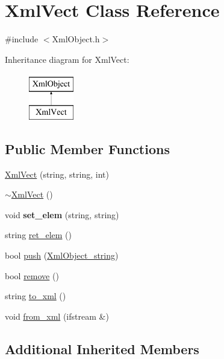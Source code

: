 \hypertarget{classXmlVect}{\section{Xml\-Vect Class Reference}
\label{classXmlVect}
}


{\ttfamily \#include $<$Xml\-Object.\-h$>$}

Inheritance diagram for Xml\-Vect\-:\begin{figure}[H]
\begin{center}
\leavevmode
\includegraphics[height=2.000000cm]{classXmlVect}
\end{center}
\end{figure}
\subsection*{Public Member Functions}
\begin{DoxyCompactItemize}
\item 
\hyperlink{classXmlVect_a031b710cdcc779a696040b98f21381e4}{Xml\-Vect} (string, string, int)
\item 
\hyperlink{classXmlVect_a0a27cde8a84f647d128260ac5df76165}{$\sim$\-Xml\-Vect} ()
\item 
\hypertarget{classXmlVect_ac8b30d8d46632736cbcce093231f89bc}{void {\bfseries set\-\_\-elem} (string, string)}\label{classXmlVect_ac8b30d8d46632736cbcce093231f89bc}

\item 
string \hyperlink{classXmlVect_a6679bc57a3e6712b99b806f1887e2dc9}{ret\-\_\-elem} ()
\item 
bool \hyperlink{classXmlVect_aa8c43c842aad1b0aa7722f7eaf2245ef}{push} (\hyperlink{classXmlObject__string}{Xml\-Object\-\_\-string})
\item 
bool \hyperlink{classXmlVect_af89d6523826f072d67f131d0ba4312aa}{remove} ()
\item 
string \hyperlink{classXmlVect_a5e67ef9b8b9faf9062b6cac413f196a4}{to\-\_\-xml} ()
\item 
void \hyperlink{classXmlVect_a105c1cd2e05c3f8512d71adbd08e91ac}{from\-\_\-xml} (ifstream \&)
\end{DoxyCompactItemize}
\subsection*{Additional Inherited Members}


